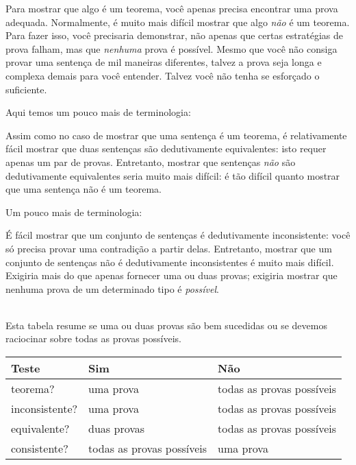 Para mostrar que algo \'e um teorema, voc\^e apenas precisa encontrar uma prova adequada. Normalmente, \'e muito mais dif\'icil mostrar que algo \emph{n\~ao} \'e um teorema. Para fazer isso, voc\^e precisaria demonstrar, n\~ao apenas que certas estrat\'egias de prova falham, mas que \emph{nenhuma} prova \'e poss\'ivel. Mesmo que voc\^e n\~ao consiga provar uma senten\c ca de mil maneiras diferentes, talvez a prova seja longa e complexa demais para voc\^e entender. Talvez voc\^e n\~ao tenha se esfor\c cado o suficiente.

Aqui temos um pouco mais de terminologia:

Assim como no caso de mostrar que uma senten\c ca \'e um teorema, \'e relativamente f\'acil mostrar que duas senten\c cas s\~ao dedutivamente equivalentes: isto requer apenas um par de provas. Entretanto, mostrar que senten\c cas \emph{n\~ao} s\~ao dedutivamente equivalentes seria muito mais dif\'icil: \'e t\~ao dif\'icil quanto mostrar que uma senten\c ca n\~ao \'e um teorema.

Um pouco mais de terminologia:
        
        \'E f\'acil mostrar que um conjunto de senten\c cas \'e dedutivamente inconsistente: voc\^e s\'o precisa provar uma contradi\c c\~ao a partir delas.  Entretanto,  mostrar que um conjunto de senten\c cas n\~ao \'e dedutivamente inconsistentes \'e muito mais dif\'icil. Exigiria mais do que apenas fornecer uma ou duas provas; exigiria mostrar que nenhuma prova de um determinado tipo \'e \emph{poss\'ivel}.

\
\\
Esta tabela resume se uma ou duas provas s\~ao bem sucedidas ou se devemos raciocinar sobre todas as provas poss\'iveis.
{ %
\begin{center}
\begin{tabular}{l l l}
\cline{1-3}
 \textbf{Teste}& \textbf{Sim} & \textbf{ N\~ao}\\
 \hline
teorema? & uma prova & todas as provas poss\'iveis\\
inconsistente? &  uma prova  & todas as provas poss\'iveis\\
equivalente? & duas provas & todas as provas poss\'iveis\\
consistente? & todas as provas poss\'iveis & uma prova\\
\cline{1-3}
\end{tabular}
\end{center}}

